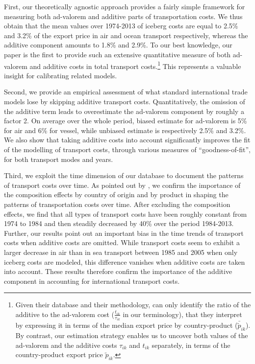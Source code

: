\documentclass[a4paper,11pt]{article}
\begin{document}
First, our theoretically agnostic approach provides a fairly simple framework for measuring both ad-valorem and additive parts of transportation costs. We thus obtain that the mean values over 1974-2013 of iceberg costs are equal to 2.5\% and 3.2\% of the export price in air and ocean transport respectively, whereas the additive component amounts to 1.8\% and 2.9\%. To our best knowledge, our paper is the first to provide such an extensive quantitative measure of both ad-valorem and additive costs in total transport costs.\footnote{Given their database and their methodology, \citet{Irrazabal_2015} can only identify the ratio of the additive to the ad-valorem cost ($\frac{t_{ik}}{\tau_{ik}}$ in our terminology), that they interpret by expressing it in terms of the median export price by country-product ($\bar{\widetilde{p}}_{ik}$). By contrast, our estimation strategy enables us to uncover both values of the ad-valorem and the additive costs $\tau_{ik}$ and $t_{ik}$ separately, in terms of the country-product export price $\widetilde{p}_{ik}$.}  This represents a valuable insight for calibrating related models.

Second, we provide an empirical assessment of what standard international trade models lose by skipping additive transport costs. Quantitatively, the omission of the additive term leads to overestimate the ad-valorem component by roughly a factor 2. On average over the whole period, biased estimate for ad-valorem is 5\% for air and 6\% for vessel, while unbiased estimate is respectively 2.5\% and 3.2\%. We also show that taking additive costs into account significantly improves the fit of the modelling of transport costs, through various measures of ``goodness-of-fit'', for both transport modes and years.

Third, we exploit the time dimension of our database to document the patterns of transport costs over time. As pointed out by \cite{hummels2007}, we confirm the importance of the composition effects by country of origin and by product in shaping the patterns of transportation costs over time. After excluding the composition effects, we find that all types of transport costs have been roughly constant from 1974 to 1984 and then steadily decreased by 40\% over the period 1984-2013. Further, our results point out an important bias in the time trends of transport costs when additive costs are omitted. While transport costs seem to exhibit a larger decrease in air than in sea transport between 1985 and 2005 when only iceberg costs are modeled, this difference vanishes when additive costs are taken into account. These results therefore confirm the importance of the additive component in accounting for international transport costs.\smallskip
\end{document}
